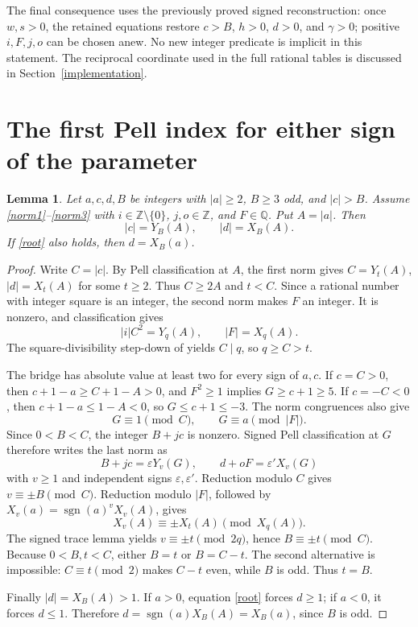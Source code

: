 \documentclass[11pt]{article}
\newtheorem{lemma}[theorem]{Lemma}
\newcommand{\Z}{\mathbb Z}\newcommand{\Q}{\mathbb Q}
\begin{document}
The final consequence uses the previously proved signed reconstruction:
once \(w,s>0\), the retained equations restore \(c>B\),
\(h>0\), \(d>0\), and \(\gamma>0\); positive \(i,F,j,o\)
can be chosen anew. No new integer predicate is implicit in this
statement. The reciprocal coordinate used in the full rational tables
is discussed in Section~\ref{implementation}.

\section{The first Pell index for either sign of the parameter}

\begin{lemma}\label{signedindex}
Let \(a,c,d,B\) be integers with \(|a|\ge2\), \(B\ge3\)
odd, and \(|c|>B\). Assume \eqref{norm1}--\eqref{norm3} with
\(i\in\Z\setminus\{0\}\), \(j,o\in\Z\), and \(F\in\Q\).
Put \(A=|a|\). Then
\[
 |c|=Y_B(A),\qquad |d|=X_B(A).
\]
If \eqref{root} also holds, then \(d=X_B(a)\).
\end{lemma}
\begin{proof}
Write \(C=|c|\). By Pell classification at \(A\), the first norm
gives \(C=Y_t(A)\), \(|d|=X_t(A)\) for some \(t\ge2\).
Thus \(C\ge2A\) and \(t<C\). Since a rational number with
integer square is an integer, the second norm makes \(F\) an integer.
It is nonzero, and classification gives
\[
 |i|C^2=Y_q(A),\qquad |F|=X_q(A).
\]
The square-divisibility step-down of \cite{Pell} yields \(C\mid q\),
so \(q\ge C>t\).

The bridge has absolute value at least two for every sign of \(a,c\).
If \(c=C>0\), then \(c+1-a\ge C+1-A>0\), and \(F^2\ge1\)
implies \(G\ge c+1\ge5\). If \(c=-C<0\), then
\(c+1-a\le1-A<0\), so \(G\le c+1\le-3\).
The norm congruences also give
\[
 G\equiv1\pmod C,\qquad G\equiv a\pmod {|F|}.
\]
Since \(0<B<C\), the integer \(B+jc\) is nonzero. Signed Pell
classification at \(G\) therefore writes the last norm as
\[
 B+jc=\varepsilon Y_v(G),\qquad
 d+oF=\varepsilon'X_v(G)
\]
with \(v\ge1\) and independent signs \(\varepsilon,\varepsilon'\).
Reduction modulo \(C\) gives \(v\equiv\pm B\pmod C\).
Reduction modulo \(|F|\), followed by
\(X_v(a)=\operatorname{sgn}(a)^vX_v(A)\), gives
\[
 X_v(A)\equiv\pm X_t(A)\pmod{X_q(A)}.
\]
The signed trace lemma yields \(v\equiv\pm t\pmod{2q}\), hence
\(B\equiv\pm t\pmod C\). Because \(0<B,t<C\), either
\(B=t\) or \(B=C-t\). The second alternative is impossible:
\(C\equiv t\pmod2\) makes \(C-t\) even, while \(B\) is odd.
Thus \(t=B\).

Finally \(|d|=X_B(A)>1\). If \(a>0\), equation \eqref{root}
forces \(d\ge1\); if \(a<0\), it forces \(d\le1\).
Therefore \(d=\operatorname{sgn}(a)X_B(A)=X_B(a)\), since \(B\)
is odd.
\end{proof}
\end{document}
